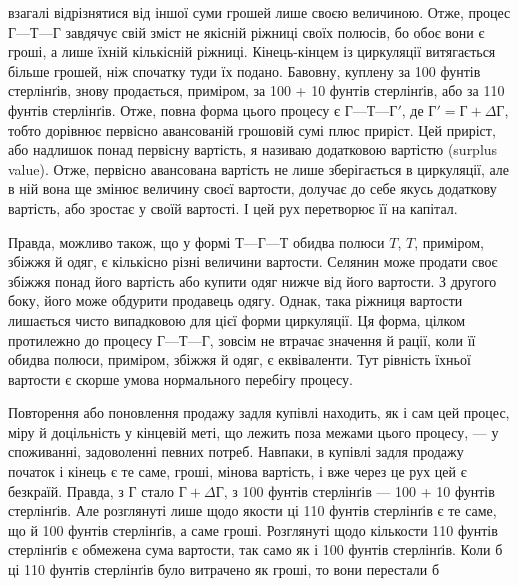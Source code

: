 взагалі відрізнятися від іншої суми грошей лише своєю величиною.
Отже, процес $Г — Т — Г$ завдячує свій зміст не якісній
ріжниці своїх полюсів, бо обоє вони є гроші, а лише їхній кількісній
ріжниці. Кінець-кінцем із циркуляції витягається більше
грошей, ніж спочатку туди їх подано. Бавовну, куплену за 100
фунтів стерлінґів, знову продається, приміром, за 100 + 10 фунтів
стерлінґів, або за 110 фунтів стерлінґів. Отже, повна форма
цього процесу є $Г — Т — Г'$, де $Г' = Г + ΔГ$, тобто дорівнює
первісно авансованій грошовій сумі плюс приріст. Цей приріст,
або надлишок понад первісну вартість, я називаю додатковою
вартістю (surplus value). Отже, первісно авансована вартість не
лише зберігається в циркуляції, але в ній вона ще змінює величину
своєї вартости, долучає до себе якусь додаткову вартість,
або зростає у своїй вартості. І цей рух перетворює її на
капітал.

Правда, можливо також, що у формі $Т — Г — Т$ обидва полюси
$T$, $T$, приміром, збіжжя й одяг, є кількісно різні величини
вартости. Селянин може продати своє збіжжя понад його вартість
або купити одяг нижче від його вартости. З другого боку, його
може обдурити продавець одягу. Однак, така ріжниця вартости
лишається чисто випадковою для цієї форми циркуляції. Ця форма,
цілком протилежно до процесу $Г — Т — Г$, зовсім не втрачає
значення й рації, коли її обидва полюси, приміром, збіжжя й
одяг, є еквіваленти. Тут рівність їхньої вартости є скорше умова
нормального перебігу процесу.

Повторення або поновлення продажу задля купівлі находить,
як і сам цей процес, міру й доцільність у кінцевій меті, що лежить
поза межами цього процесу, — у споживанні, задоволенні певних
потреб. Навпаки, в купівлі задля продажу початок і кінець
є те саме, гроші, мінова вартість, і вже через це рух цей є безкраїй.
Правда, з $Г$ стало $Г + ΔГ$, з 100 фунтів стерлінґів — 100 + 10 фунтів
стерлінґів. Але розглянуті лише щодо якости ці 110 фунтів
стерлінґів є те саме, що й 100 фунтів стерлінґів, а саме гроші.
Розглянуті щодо кількости 110 фунтів стерлінґів є обмежена сума
вартости, так само як і 100 фунтів стерлінґів. Коли б ці 110 фунтів
стерлінґів було витрачено як гроші, то вони перестали б
\parbreak{}  %
